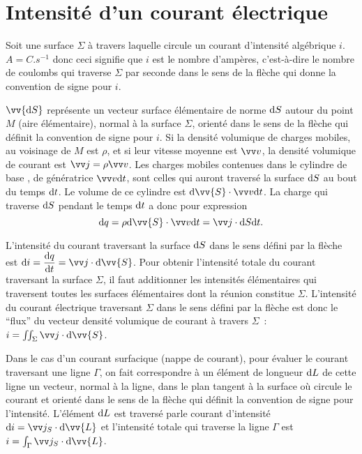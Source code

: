 \section{Intensité d'un courant électrique}%
\label{chap9-sec:intensiteduncourantelectrique}%

Soit une surface \(\Sigma\) à travers laquelle circule un courant d'intensité 
algébrique \(i\). \(\si{A}=\si{C.s^{-1}}\) donc ceci signifie que \(i\) est le 
nombre d'ampères, c'est-à-dire le nombre de coulombs qui traverse \(\Sigma\) 
par seconde dans le sens de la flèche qui donne la convention de signe pour 
\(i\).

\(\vv{\D S}\) représente un vecteur surface élémentaire de norme \(\mathrm{d} S\) 
autour du point \(M\) (aire élémentaire), normal à la surface \(\Sigma\), 
orienté dans le sens de la flèche qui définit la convention de signe pour 
\(i\). Si la densité volumique de charges mobiles, au voisinage de \(M\) est 
\(\rho\), et si leur vitesse moyenne est \(\vvv\), la densité volumique de 
courant est \(\vj = \rho \vvv\).
Les charges mobiles contenues dans le cylindre de base , de génératrice \(\vvv 
\D t\), sont celles qui auront traversé la surface \(\mathrm{d} S\) au bout du temps 
\(\mathrm{d} t\). Le volume de ce cylindre est \(\D \vv{S} \cdot \vvv\D t\).
La charge qui traverse \(\mathrm{d} S\) pendant le temps \(\mathrm{d} t\) a donc pour 
expression
\begin{equation}%
  \D q = \rho \D \vv{S} \cdot \vvv \D t = \vj \cdot \D S \D t.
\end{equation}%

L'intensité du courant traversant la surface \(\mathrm{d} S\) dans le sens défini par 
la flèche est \(\D i = \derived{q}{t} = \vj \cdot \D \vv{S}\).
Pour obtenir l'intensité totale du courant traversant la surface \(\Sigma\), il 
faut additionner les intensités élémentaires qui traversent toutes les surfaces 
élémentaires dont la réunion constitue \(\Sigma\).
L'intensité du courant électrique traversant \(\Sigma\) dans le sens défini par 
la flèche est donc le ``flux'' du vecteur densité volumique de courant à 
travers \(\Sigma\)~: \(i = \iint_\Sigma \vj \cdot \D \vv{S}\).

Dans le cas d'un courant surfacique (nappe de courant), pour évaluer le courant  
traversant une ligne \(\Gamma\), on fait correspondre à un élément de longueur 
\(\mathrm{d} L\) de cette ligne un vecteur, normal à la ligne, dans le plan tangent à 
la surface où circule le courant et orienté dans le sens de la flèche qui 
définit la convention de signe pour l'intensité. L'élément \(\mathrm{d} L\) est 
traversé parle courant d'intensité \(\D i = \vj_S \cdot \D \vv{L}\) et 
l'intensité totale qui traverse la ligne \(\Gamma\) est \(i = \int_\Gamma \vj_S 
\cdot \D \vv{L}\).

